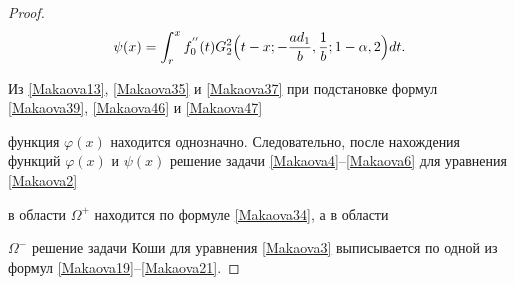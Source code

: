 \begin{proof}
\begin{equation}
\psi(x)=\int _{r}^{x} f_0^{''}(t)  G_2^2

\Bigl( t-x; -\frac{ad_1}{b}, \frac{1}{b};1-\alpha,2 \Bigr) dt.

\end{equation}





Из \eqref{Makaova13}, \eqref{Makaova35}  и \eqref{Makaova37} при подстановке формул \eqref{Makaova39}, \eqref{Makaova46} и \eqref{Makaova47}

 функция $\varphi(x)$ находится однозначно. Следовательно, после нахождения функций $\varphi(x)$ и $\psi (x)$ решение задачи \eqref{Makaova4}--\eqref{Makaova6} для уравнения \eqref{Makaova2} 

в области $\Omega^+ $ находится по формуле \eqref{Makaova34}, а в области 

$\Omega^-$ решение задачи Коши для уравнения \eqref{Makaova3} выписывается по одной из формул \eqref{Makaova19}--\eqref{Makaova21}.

 \end{proof} 







\bigskip












